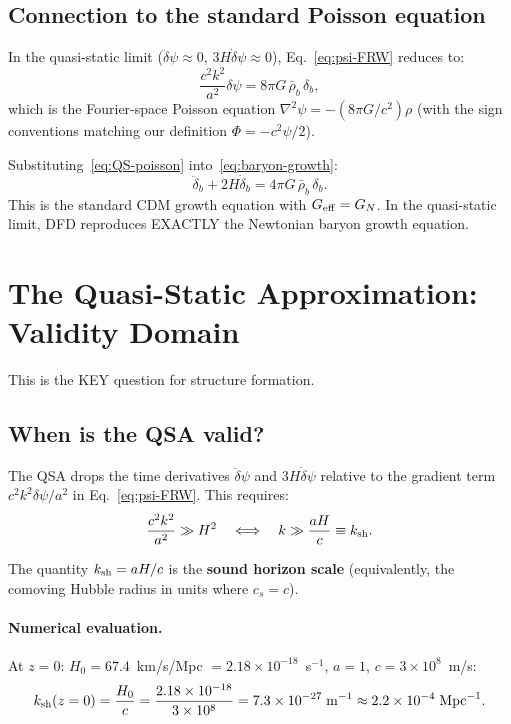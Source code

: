 \documentclass[aps,prd,twocolumn,nofootinbib]{revtex4-2}
\newcommand{\ee}[1]{\times 10^{#1}}
\newcommand{\dpsi}{\delta\psi}
\newcommand{\Geff}{G_{\rm eff}}
\newcommand{\ksh}{k_{\rm sh}}
\begin{document}
\subsection{Connection to the standard Poisson equation}

In the quasi-static limit ($\ddot\dpsi \approx 0$, $3H\dot\dpsi
\approx 0$), Eq.~\eqref{eq:psi-FRW} reduces to:
\begin{equation}
\frac{c^2 k^2}{a^2}\dpsi = 8\pi G\,\bar\rho_b\,\delta_b,
\label{eq:QS-poisson}
\end{equation}
which is the Fourier-space Poisson equation
$\nabla^2\psi = -(8\pi G/c^2)\rho$ (with the sign conventions
matching our definition $\Phi = -c^2\psi/2$).

Substituting~\eqref{eq:QS-poisson} into~\eqref{eq:baryon-growth}:
\begin{equation}
\ddot\delta_b + 2H\dot\delta_b = 4\pi G\,\bar\rho_b\,\delta_b.
\label{eq:standard-growth}
\end{equation}
This is the standard CDM growth equation with $\Geff = G_N$.
In the quasi-static limit, DFD reproduces EXACTLY the Newtonian
baryon growth equation.


\section{The Quasi-Static Approximation: Validity Domain}
\label{sec:QSA}

This is the KEY question for structure formation.

\subsection{When is the QSA valid?}

The QSA drops the time derivatives $\ddot\dpsi$ and $3H\dot\dpsi$
relative to the gradient term $c^2 k^2\dpsi/a^2$ in
Eq.~\eqref{eq:psi-FRW}. This requires:
\begin{equation}
\frac{c^2 k^2}{a^2} \gg H^2 \quad\Longleftrightarrow\quad
k \gg \frac{aH}{c} \equiv \ksh.
\label{eq:QSA-condition}
\end{equation}

The quantity $\ksh = aH/c$ is the \textbf{sound horizon scale}
(equivalently, the comoving Hubble radius in units where $c_s = c$).

\paragraph{Numerical evaluation.}
At $z = 0$: $H_0 = 67.4$~km/s/Mpc $= 2.18\ee{-18}$~s$^{-1}$,
$a = 1$, $c = 3\ee{8}$~m/s:
\begin{equation}
\ksh(z=0) = \frac{H_0}{c} = \frac{2.18\ee{-18}}{3\ee{8}}
= 7.3\ee{-27}\;\text{m}^{-1}
\approx 2.2\ee{-4}\;\text{Mpc}^{-1}.
\label{eq:ksh-z0}
\end{equation}
\end{document}
